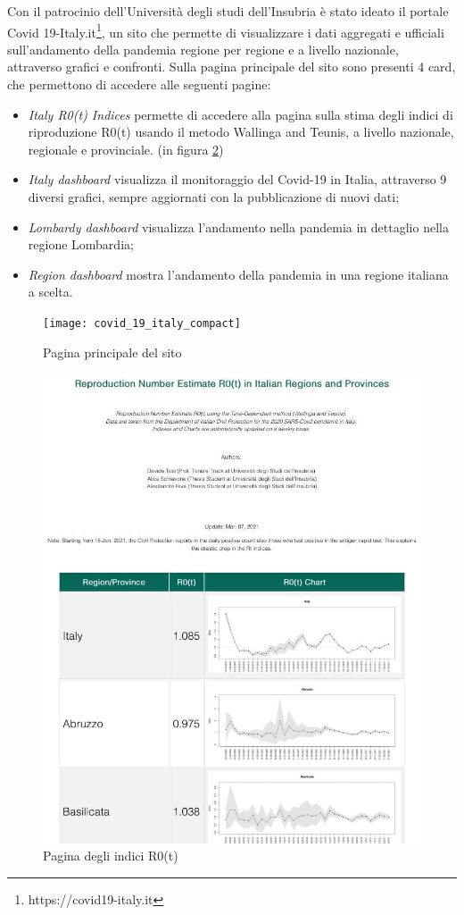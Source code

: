 Con il patrocinio dell’Università degli studi dell’Insubria è stato ideato il portale Covid 19-Italy.it\footnote{https://covid19-italy.it}, un sito che permette di visualizzare i dati aggregati e ufficiali sull’andamento della pandemia regione per regione e a livello nazionale, attraverso grafici e confronti.
Sulla pagina principale del sito sono presenti 4 card, che permettono di accedere alle seguenti pagine:
\begin{itemize}
\item \emph{Italy R0(t) Indices} permette di accedere alla pagina sulla stima degli indici di riproduzione R0(t) usando il metodo Wallinga and Teunis, a livello nazionale, regionale e provinciale. (in figura \ref{fig:indici_r0})
\item \emph{Italy dashboard} visualizza il monitoraggio del Covid-19 in Italia, attraverso 9 diversi grafici, sempre aggiornati con la pubblicazione di nuovi dati;
\item \emph{Lombardy dashboard} visualizza l’andamento nella pandemia in dettaglio nella regione Lombardia;
\item \emph{Region dashboard} mostra l’andamento della pandemia in una regione italiana a scelta.
\end{itemize}
\begin{figure}[htp]
    \centering
    \texttt{[image: covid\_19\_italy\_compact]}
    \caption{Pagina principale del sito}
    \label{fig:home_page}
\end{figure}
\begin{figure}[htp]
    \centering
    \includegraphics[width=15cm]{img/r0_screen.jpg}
    \caption{Pagina degli indici R0(t)}
    \label{fig:indici_r0}
\end{figure}

